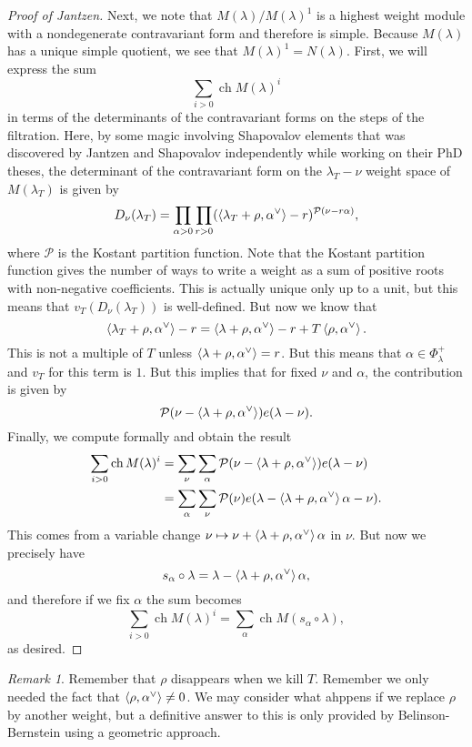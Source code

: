 \documentclass{amsart}
\theoremstyle{definition}
\theoremstyle{remark}
\newtheorem{rmk}[thm]{Remark}
\theoremstyle{plain}
\theoremstyle{definition}
\theoremstyle{remark}
\newcommand{\mc}[1]{\mathcal{#1}}
\newcommand{\1}{\mathbf{1}}
\newcommand{\2}{\mathbf{2}}
\newcommand{\3}{\mathbf{3}}
\DeclareMathOperator{\ch}{ch}
\begin{document}
\begin{proof}[Proof of Jantzen]
  Next, we note that $M(\lambda) / M(\lambda)^1$ is a highest weight module with a nondegenerate contravariant form and therefore is simple. Because $M(\lambda)$ has a unique simple quotient, we see that $M(\lambda)^1 = N(\lambda)$. First, we will express the sum
  \[ \sum_{i > 0} \ch M(\lambda)^i\]
  in terms of the determinants of the contravariant forms on the steps of the filtration. Here, by some magic involving Shapovalov elements that was discovered by Jantzen and Shapovalov independently while working on their PhD theses, the determinant of the contravariant form on the $\lambda_T - \nu$ weight space of $M(\lambda_T)$ is given by
  \[ D_{\nu}(\lambda_T) = \prod_{\alpha > 0} \prod_{r > 0} (\ev{\lambda_T + \rho, \alpha^{\vee}} - r)^{\mc{P}(\nu - r \alpha)}, \]
  where $\mc{P}$ is the Kostant partition function. Note that the Kostant partition function gives the number of ways to write a weight as a sum of positive roots with non-negative coefficients. This is actually unique only up to a unit, but this means that $v_T(D_{\nu}(\lambda_T))$ is well-defined. But now we know that
  \[ \ev{\lambda_T + \rho, \alpha^{\vee}} - r = \ev{\lambda + \rho, \alpha^{\vee}} - r + T \ev{\rho, \alpha^{\vee}}. \]
  This is not a multiple of $T$ unless $\ev{\lambda + \rho, \alpha^{\vee}} = r$. But this means that $\alpha \in \Phi_{\lambda}^+$ and $v_T$ for this term is $1$. But this implies that for fixed $\nu$ and $\alpha$, the contribution is given by
  \[ \mc{P}(\nu - \ev{\lambda + \rho, \alpha^{\vee}}) e(\lambda - \nu). \]
  Finally, we compute formally and obtain the result
  \begin{align*}
    \sum_{i > 0} \ch M(\lambda)^i &= \sum_{\nu} \sum_{\alpha} \mc{P}(\nu - \ev{\lambda + \rho, \alpha^{\vee}}) e(\lambda - \nu) \\
    &= \sum_{\alpha} \sum_{\nu} \mc{P}(\nu) e(\lambda - \ev{\lambda + \rho, \alpha^{\vee}} \alpha - \nu).
  \end{align*}
  This comes from a variable change $\nu \mapsto \nu + \ev{\lambda + \rho, \alpha^{\vee}} \alpha$ in $\nu$. But now we precisely have
  \[ s_{\alpha} \circ \lambda = \lambda - \ev{\lambda + \rho, \alpha^{\vee}} \alpha, \]
  and therefore if we fix $\alpha$ the sum becomes
  \[ \sum_{i > 0} \ch M(\lambda)^i = \sum_{\alpha} \ch M(s_{\alpha} \circ \lambda), \]
  as desired.
\end{proof}

\begin{rmk}
  Remember that $\rho$ disappears when we kill $T$. Remember we only needed the fact that $\ev{\rho, \alpha^{\vee}} \neq 0$. We may consider what ahppens if we replace $\rho$ by another weight, but a definitive answer to this is only provided by Belinson-Bernstein using a geometric approach.
\end{rmk}
\end{document}
